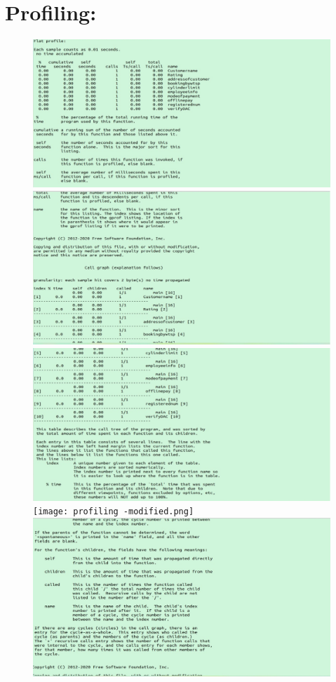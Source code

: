 \documentclass{article}
\begin{document}
{\section{Profiling:}
\begin{figure}
    \centering
    \includegraphics[width=\linewidth]{profiling 1-modified.png}
    \includegraphics[width=\linewidth]{profiling 2-modified.png}
    \includegraphics[width=\linewidth]{profiling 3-modified.png}
    \texttt{[image: profiling -modified.png]}
    \includegraphics[width=\linewidth]{profiling 5-modified.png}

\end{figure}}
\end{document}
